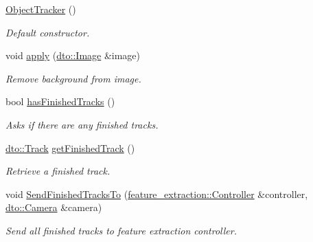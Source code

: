 \begin{DoxyCompactItemize}
\item 
\mbox{\label{classimage__tracking_1_1_object_tracker_a0e793f373b36336ad4fd25e1e73cdaf4}} 
\mbox{\hyperlink{classimage__tracking_1_1_object_tracker_a0e793f373b36336ad4fd25e1e73cdaf4}{Object\+Tracker}} ()
\begin{DoxyCompactList}\small\item\em Default constructor. \end{DoxyCompactList}\item 
\mbox{\label{classimage__tracking_1_1_object_tracker_a59d0071d4ea8dc8a82cdd7bafa4a3005}} 
void \mbox{\hyperlink{classimage__tracking_1_1_object_tracker_a59d0071d4ea8dc8a82cdd7bafa4a3005}{apply}} (\mbox{\hyperlink{structdto_1_1_image}{dto\+::\+Image}} \&image)
\begin{DoxyCompactList}\small\item\em Remove background from image. \end{DoxyCompactList}\item 
\mbox{\label{classimage__tracking_1_1_object_tracker_a7b6a10b4eeb8e9cdedf95e7bffc2ecc6}} 
bool \mbox{\hyperlink{classimage__tracking_1_1_object_tracker_a7b6a10b4eeb8e9cdedf95e7bffc2ecc6}{has\+Finished\+Tracks}} ()
\begin{DoxyCompactList}\small\item\em Asks if there are any finished tracks. \end{DoxyCompactList}\item 
\mbox{\label{classimage__tracking_1_1_object_tracker_a029f09b380ea62d7e8c7191b44d0a92c}} 
\mbox{\hyperlink{structdto_1_1_track}{dto\+::\+Track}} \mbox{\hyperlink{classimage__tracking_1_1_object_tracker_a029f09b380ea62d7e8c7191b44d0a92c}{get\+Finished\+Track}} ()
\begin{DoxyCompactList}\small\item\em Retrieve a finished track. \end{DoxyCompactList}\item 
\mbox{\label{classimage__tracking_1_1_object_tracker_a30e604013c2028c894d3cf5904bce2c8}} 
void \mbox{\hyperlink{classimage__tracking_1_1_object_tracker_a30e604013c2028c894d3cf5904bce2c8}{Send\+Finished\+Tracks\+To}} (\mbox{\hyperlink{classfeature__extraction_1_1_controller}{feature\+\_\+extraction\+::\+Controller}} \&controller, \mbox{\hyperlink{structdto_1_1_camera}{dto\+::\+Camera}} \&camera)
\begin{DoxyCompactList}\small\item\em Send all finished tracks to feature extraction controller. \end{DoxyCompactList}\end{DoxyCompactItemize}


